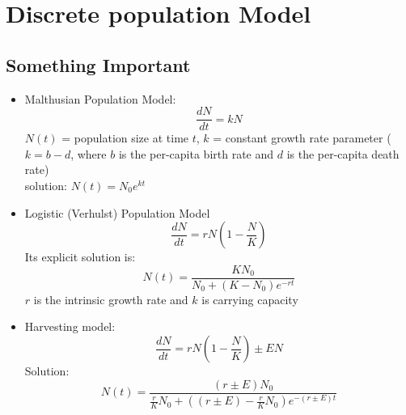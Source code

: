 \chapter{Discrete population Model}
\section*{Something Important}
\begin{itemize}
    \item Malthusian Population Model:
    $$\frac{dN}{dt} = k N$$
    $N(t)$ = population size at time $t$, $k$ = constant growth rate parameter ($k = b - d$, where $b$ is the per-capita birth rate and $d$ is the per-capita death rate)\\
    solution: $N(t) = N_0 e^{kt}$
    \item Logistic (Verhulst) Population Model
    $$\frac{dN}{dt} = r N \left(1 - \frac{N}{K}\right)$$Its explicit solution is:$$N(t) = \frac{K N_0}{N_0 + (K - N_0) e^{-rt}}$$
    $r$ is the intrinsic growth rate and $k$ is carrying capacity
    \item Harvesting model:
    $$\frac{dN}{dt} = rN \left(1 - \frac{N}{K}\right) \pm EN $$
    Solution:
    $$N(t) = \frac{(r \pm E) N_0}{\frac{r}{K} N_0 + \left( (r \pm E) - \frac{r}{K} N_0 \right) e^{-(r \pm E)t}}$$

    

\end{itemize}